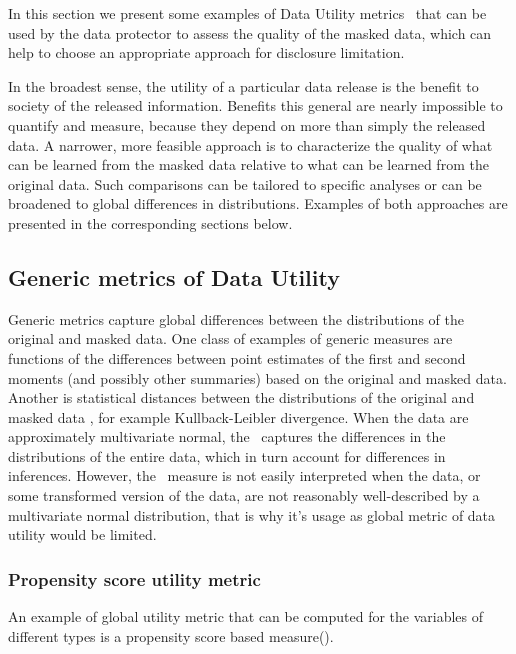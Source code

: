 In this section we present some examples of Data Utility metrics \DU\ that can be used by the data protector to assess the quality of the masked data, which can help to choose an appropriate approach for disclosure limitation.

In the broadest sense, the utility of a particular data release is the
benefit to society of the released information. Benefits this general
are nearly impossible to quantify and measure, because they depend on
more than simply the released data. A narrower, more feasible approach
is to characterize the quality of what can be learned from the masked
data relative to what can be learned from the original data. Such
comparisons can be tailored to specific analyses or can be broadened
to global differences in distributions. Examples of both approaches are presented in the corresponding sections below.

\subsection{Generic metrics of Data Utility}

Generic metrics capture global differences between the distributions of the original and masked data. 
One class of examples of generic measures are functions of the differences between point estimates of the first and second moments (and possibly other summaries) based on the original and masked data. Another is statistical distances between the distributions of the original and masked data \cite{dfks02, gks06}, for example Kullback-Leibler divergence.  When the data are approximately multivariate normal, the \KL\ captures the differences in the distributions of the entire data,
which in turn account for differences in inferences. 
However, the \KL\ measure is not easily
interpreted when the data, or some transformed version of the
data, are not reasonably well-described by a multivariate normal
distribution, that is why it's  usage as  global metric of data utility
would be limited.



\subsubsection{Propensity score utility metric}

An example of global utility metric that can be computed for the variables of different types is a propensity score based measure(\cite{propen}).

